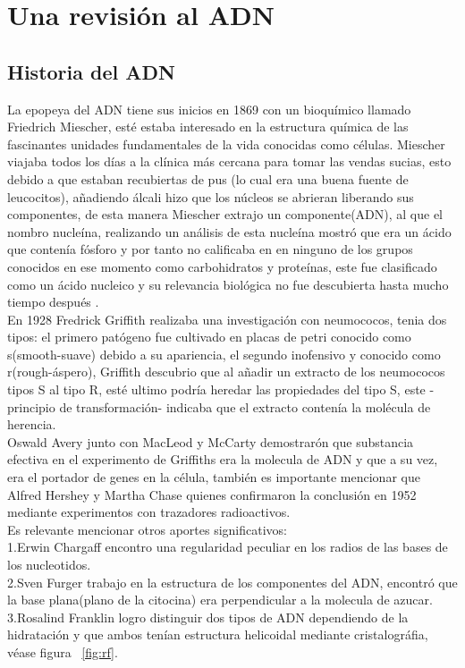 
\clearpage

\section{Una revisión al ADN}
\label{sec:ADN}


\subsection{Historia del ADN}
La epopeya del ADN tiene sus inicios en 1869 con un bioquímico llamado Friedrich Miescher, esté estaba interesado en la estructura química de las fascinantes unidades fundamentales de la vida conocidas como células.
Miescher viajaba todos los días a la clínica más cercana para tomar las vendas sucias, esto debido a que estaban recubiertas de pus (lo cual era una buena fuente de leucocitos), añadiendo álcali hizo que los núcleos se abrieran liberando sus componentes, de esta manera Miescher extrajo un componente(ADN), al que el nombro nucleína, realizando un análisis de esta nucleína mostró que era un ácido que contenía fósforo y por tanto no calificaba en en ninguno de los grupos conocidos en ese momento como carbohidratos y proteínas, este fue clasificado como un ácido nucleico y su relevancia biológica no fue descubierta hasta mucho tiempo después \cite{Susan}.\\

En 1928 Fredrick Griffith realizaba una investigación con neumococos, tenia dos tipos: el primero patógeno  fue cultivado en placas de petri conocido como s(smooth-suave) debido a su apariencia, el segundo inofensivo y conocido como r(rough-áspero), Griffith descubrio que al añadir un extracto de los neumococos tipos S al tipo R, esté ultimo podría heredar las propiedades del tipo S, este -principio de transformación- indicaba que el extracto contenía la molécula de herencia.\\

Oswald Avery junto con MacLeod y McCarty demostrarón que substancia efectiva en el experimento de Griffiths era la molecula de ADN y que a su vez, era el portador de genes en la célula, también es importante mencionar que Alfred Hershey y Martha Chase quienes confirmaron la conclusión en 1952 mediante experimentos con trazadores radioactivos\cite{Thormod}.\\

Es relevante mencionar otros aportes significativos: \\
1.Erwin Chargaff encontro una regularidad peculiar en los radios de las bases de los nucleotidos.\\
2.Sven Furger trabajo en la estructura de los componentes del ADN, encontró que la base plana(plano de la citocina) era perpendicular a la molecula de azucar.\\
3.Rosalind Franklin logro distinguir dos tipos de ADN dependiendo de la hidratación y que ambos tenían estructura helicoidal mediante cristalográfia, véase figura ~\ref{fig:rf}.

